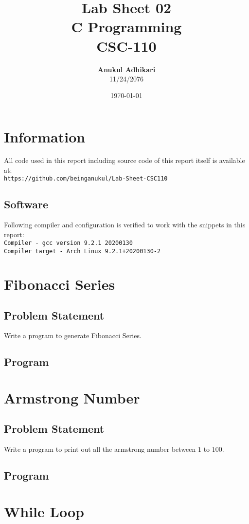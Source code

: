 \documentclass[11pt]{report}
\title{Lab Sheet 02 \\
      \textbf{C Programming} \\
      CSC-110}
\author{\textbf{Anukul Adhikari} \\ 11/24/2076}
\date{\today}
\begin{document}
\maketitle

\chapter*{Information}
All code used in this report including source code of this report itself is available at:\\ \texttt{https://github.com/beinganukul/Lab-Sheet-CSC110}
\section*{Software}
Following compiler and configuration is verified to work with the snippets in this report:\\
\texttt{Compiler - gcc version 9.2.1 20200130\\
Compiler target - Arch Linux 9.2.1+20200130-2
}

\tableofcontents

\chapter{Fibonacci Series}
\section{Problem Statement}
Write a program to generate Fibonacci Series.
\section{Program}


\chapter{Armstrong Number}
\section{Problem Statement}
Write a program to print out all the armstrong number between $1$ to $100$.
\section{Program}


\chapter{While Loop}
\end{document}
